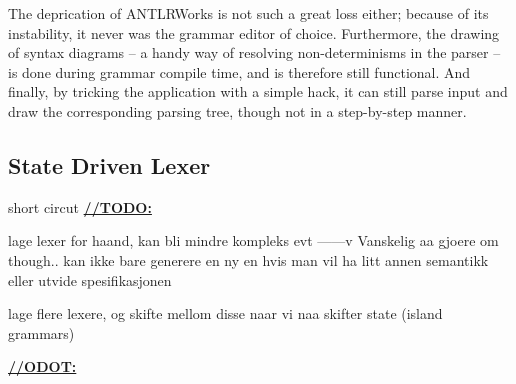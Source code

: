 The deprication of ANTLRWorks is not such a great loss either; because of its instability, it never was the grammar editor of choice. Furthermore, the drawing of syntax diagrams -- a handy way of resolving non-determinisms in the parser -- is done during grammar compile time, and is therefore still functional. And finally, by tricking the application with a simple hack, it can still parse input and draw the corresponding parsing tree, though not in a step-by-step manner.

\subsection{State Driven Lexer}
short circut
\underline{\textbf{\LARGE //TODO:}}

lage lexer for haand, kan bli mindre kompleks evt ------v Vanskelig aa gjoere om though.. kan ikke bare generere en ny en hvis man vil ha litt annen semantikk eller utvide spesifikasjonen

lage flere lexere, og skifte mellom disse naar vi naa skifter state (island grammars)

\underline{\textbf{\LARGE //ODOT:}}